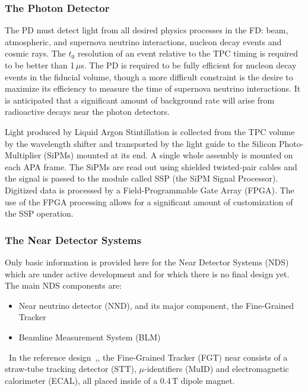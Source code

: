 \subsubsection{The Photon Detector}
\label{sec:pd}
The PD must detect light from all desired physics processes in the FD: beam, atmospheric, and supernova neutrino interactions,
nucleon decay events and cosmic rays.  The $t_0$ resolution of an event relative to the TPC timing is required to be
better than 1\,$\mu$s.  The PD is required to be fully efficient for nucleon decay events in the fiducial volume, though a
more difficult constraint is the desire to maximize its efficiency to measure the time of supernova neutrino interactions.
It is anticipated that a significant amount of background rate will arise from radioactive decays near the photon detectors.

Light produced by Liquid Argon Stintillation is collected from the TPC volume by the wavelength shifter and transported
by the light guide to the Silicon Photo-Multiplier (SiPMs) mounted at its end. A single whole assembly is mounted on each  APA frame.
The SiPMs are read out using shielded twisted-pair cables and the signal is passed to the module called SSP (the SiPM Signal
Processor). Digitized data is processed by a  Field-Programmable Gate Array (FPGA). The use
of the FPGA processing allows for a significant amount of customization of the SSP operation.


\subsubsection{The Near Detector Systems}
\label{sec:nds-params}
Only basic information is provided here for the Near Detector Systems (NDS) which are under active development
and for which there is no final design yet. The main NDS components are:
\begin{itemize}
\item Near neutrino detector (NND), and its major component, the Fine-Grained Tracker
\item Beamline Measurement System (BLM)
\end{itemize}
\ 
In the reference design~\cite{cdr_vol4_docdb},, the Fine-Grained Tracker (FGT) near consists of a straw-tube
tracking detector (STT), $\mu$-identifiers (MuID) and electromagnetic calorimeter (ECAL), all placed inside of a 0.4\,T dipole magnet.

